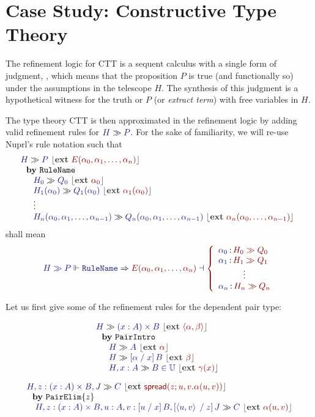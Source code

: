 \documentclass[11pt]{article}
\theoremstyle{definition}
\theoremstyle{remark}
\numberwithin{equation}{section}
\def\IModeColorName{MidnightBlue}
\def\OModeColorName{Maroon}
\newcommand\IMode[1]{{\color{\IModeColorName}{#1}}}
\newcommand\OMode[1]{{\color{\OModeColorName}{#1}}}
\newcommand\OSG[2]{\IMode{#1}\,{\color{Black}:}\,\OMode{#2}}
\newcommand\Refine[4]{\IMode{#1}\Vdash\IMode{#2}\Rightarrow\OMode{#4}\dashv\OMode{#3}}
\newcommand\MemberUnmoded[2]{#1\in #2}
\newcommand\DPairIntroRuleNullary{\mathtt{PairIntro}}
\newcommand\DPairElimRule[1]{\mathtt{PairElim}\{#1\}}
\newcommand\TyDPair[3]{(#2:#1) \times #3}
\newcommand\Tuple[1]{\left\langle#1\right\rangle}
\newcommand\Spread[4]{\mathsf{spread}(#1;#2,#3.#4)}
\newcommand\TyUniv{\mathbb{U}}
\newcommand\Subst[3]{\left[#1\;/\;#2\right]#3}
\newcommand\Seq[2]{#1 \gg #2}
\newcommand\Ext[1]{{\color{dark-gray}\left\lfloor\mathbf{ext}\ \OMode{#1}\right\rfloor}}
\newcommand\SeqExt[3]{
  \Seq{\IMode{#1}}{\IMode{#2}}\ \Ext{#3}
}
\newcommand\NuprlRule[3]{%
  \begin{array}{l}%
    #2\\
    \ \ \mathbf{by}\ #1\\
    \quad #3
  \end{array}%
}
\begin{document}
\section{Case Study: Constructive Type Theory}

The refinement logic for CTT is a sequent calculus with a single form of
judgment, \framebox{$\Seq{\IMode{H}}{\IMode{P}}$}, which means that the
proposition $P$ is true (and functionally so) under the assumptions in the
telescope $H$. The synthesis of this judgment is a hypothetical witness for the
truth or $P$ (or \emph{extract term}) with free variables in $H$.

The type theory CTT is then approximated in the refinement logic by adding
valid refinement rules for $\Seq{\IMode{H}}{\IMode{P}}$. For the sake of
familiarity, we will re-use Nuprl's rule notation such that
\[
  \NuprlRule{\texttt{RuleName}}{
    \SeqExt{H}{P}{E(\alpha_0,\alpha_1,\dots,\alpha_n)}
  }{
    \begin{array}{l}
      \SeqExt{H_0}{Q_0}{\alpha_0}\\
      \SeqExt{H_1(\alpha_0)}{Q_1(\alpha_0)}{\alpha_1(\alpha_0)}\\
      \vdots\\
      \SeqExt{H_n(\alpha_0,\alpha_1,\dots,\alpha_{n-1})}{Q_n(\alpha_0,\alpha_1,\dots,\alpha_{n-1})}{\alpha_n(\alpha_0,\dots,\alpha_{n-1})}
    \end{array}
  }
\]
shall mean
\[
  \Refine{
    \Seq{H}{P}
  }{
    \mathtt{RuleName}
  }{
    \left\{\begin{array}{l}
      \OSG{\alpha_0}{\Seq{H_0}{Q_0}}\\
      \OSG{\alpha_1}{\Seq{H_1}{Q_1}}\\
      \multicolumn{1}{c}{\color{Black}\vdots}\\
      \OSG{\alpha_n}{\Seq{H_n}{Q_n}}\\
    \end{array}\right.
  }{
    E(\alpha_0,\alpha_1,\dots,\alpha_n)
  }
\]


Let us first give some of the refinement rules for the dependent pair type:

\begin{gather*}
  \NuprlRule{\DPairIntroRuleNullary}{
    \SeqExt{H}{\TyDPair{A}{x}{B}}{\Tuple{\alpha,\beta}}
  }{
    \begin{array}{l}
      \SeqExt{H}{A}{\alpha}\\
      \SeqExt{H}{\Subst{\alpha}{x}{B}}{\beta}\\
      \SeqExt{H,x:A}{\MemberUnmoded{B}{\TyUniv}}{\gamma(x)}
    \end{array}
  }\\[6pt]
  \NuprlRule{\DPairElimRule{z}}{
    \SeqExt{H,z:\TyDPair{A}{x}{B},J}{C}{
      \Spread{z}{u}{v}{\alpha(u,v)}
    }
  }{
    \SeqExt{H,z:\TyDPair{A}{x}{B},u:A,v:\Subst{u}{x}{B},\Subst{\Tuple{u,v}}{z}{J}}{C}{
      \alpha(u,v)
    }
  }
\end{gather*}
\end{document}
